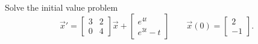\documentclass{ximera}
\begin{document}
\begin{exercise}
    Solve the initial value problem
    \[ 
        {\vec{x}}' = 
        \begin{bmatrix} 
            3 & 2 \\ 
            0 & 4 
        \end{bmatrix}\vec{x} 
        + 
        \begin{bmatrix} 
            e^{4t} \\ 
            e^{3t} - t 
        \end{bmatrix} 
        \qquad \vec{x}(0) = 
        \begin{bmatrix} 
            2 \\ 
            -1 
        \end{bmatrix}. 
    \]
\end{exercise}
\end{document}
